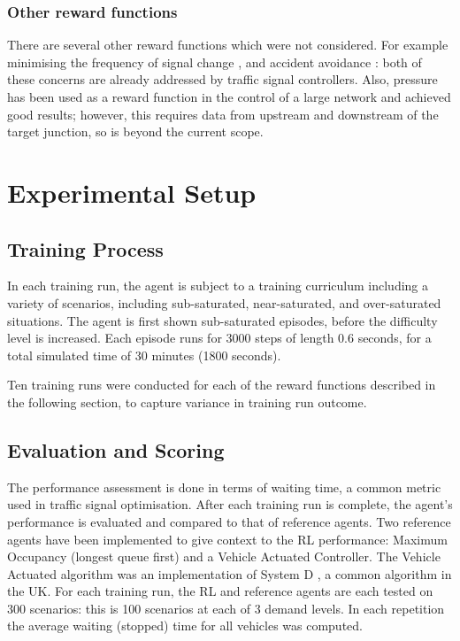 \documentclass{article}
\begin{document}
\subsubsection{Other reward functions}
There are several other reward functions which were not considered. For example minimising the frequency of signal change \cite{vanderpol2016} \cite{wei2018}, and accident avoidance \cite{vanderpol2016}: both of these concerns are already addressed by traffic signal controllers. Also, pressure has been used as a reward function in the control of a large network \cite{wei2019a} \cite{yau} \cite{wei2019} \cite{varaiya2013} \cite{wei2018}  \cite{chen2020} and achieved good results; however, this requires data from upstream and downstream of the target junction, so is beyond the current scope.

\section{Experimental Setup}\label{exp_setup}
\subsection{Training Process}

In each training run, the agent is subject to a training curriculum including a variety of scenarios, including sub-saturated, near-saturated, and over-saturated situations. The agent is first shown sub-saturated episodes, before the difficulty level is increased. Each episode runs for 3000 steps of length 0.6 seconds, for a total simulated time of 30 minutes (1800 seconds).

Ten training runs were conducted for each of the reward functions described in the following section, to capture variance in training run outcome.

\subsection{Evaluation and Scoring}
The performance assessment is done in terms of waiting time, a common metric used in traffic signal optimisation.
After each training run is complete, the agent's performance is evaluated and compared to that of reference agents. Two reference agents have been implemented to give context to the RL performance: Maximum Occupancy (longest queue first) and a Vehicle Actuated Controller. The Vehicle Actuated algorithm was an implementation of System D \cite{highways}, a common algorithm in the UK.  For each training run, the RL and reference agents are each tested on 300 scenarios: this is 100 scenarios at each of 3 demand levels. In each repetition the average waiting (stopped) time for all vehicles was computed.
\end{document}
